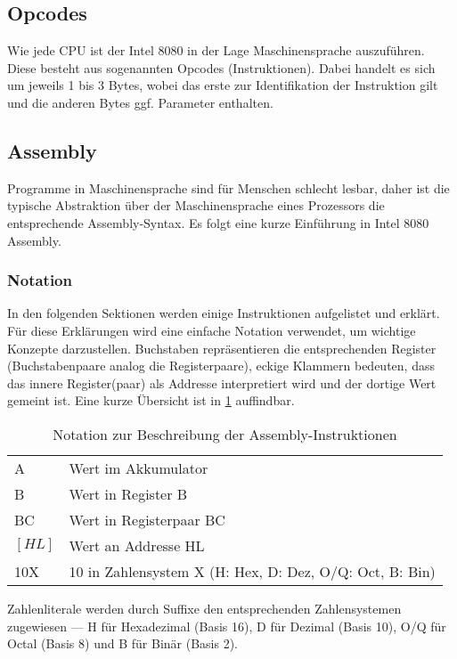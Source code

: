 \subsection{Opcodes}\label{sec:opcodes}

Wie jede CPU ist der Intel 8080 in der Lage Maschinensprache auszuführen. Diese besteht aus sogenannten Opcodes (Instruktionen). Dabei handelt es sich um jeweils 1 bis 3 Bytes, wobei das erste zur Identifikation der Instruktion gilt und die anderen Bytes ggf. Parameter enthalten.


\subsection{Assembly}

Programme in Maschinensprache sind für Menschen schlecht lesbar, daher ist die typische Abstraktion über der Maschinensprache eines Prozessors die entsprechende Assembly-Syntax.
Es folgt eine kurze Einführung in Intel 8080 Assembly.

\subsubsection{Notation}

In den folgenden Sektionen werden einige Instruktionen aufgelistet und erklärt. Für diese Erklärungen wird eine einfache Notation verwendet, um wichtige Konzepte darzustellen. Buchstaben repräsentieren die entsprechenden Register (Buchstabenpaare analog die Registerpaare), eckige Klammern bedeuten, dass das innere Register(paar) als Addresse interpretiert wird und der dortige Wert gemeint ist.
Eine kurze Übersicht ist in \cref{tab:notation} auffindbar.

\begin{table}[h]
    \centering
    \caption{Notation zur Beschreibung der Assembly-Instruktionen}
    \label{tab:notation}
    \begin{tabular}{l | l}
        A & Wert im Akkumulator\\
        B & Wert in Register B\\
        BC & Wert in Registerpaar BC\\
        $[HL]$ & Wert an Addresse HL\\
        10X & 10 in Zahlensystem X (H: Hex, D: Dez, O/Q: Oct, B: Bin)
    \end{tabular}
\end{table}

Zahlenliterale werden durch Suffixe den entsprechenden Zahlensystemen zugewiesen --- H für Hexadezimal (Basis 16), D für Dezimal (Basis 10), O/Q für Octal (Basis 8) und B für Binär (Basis 2).

